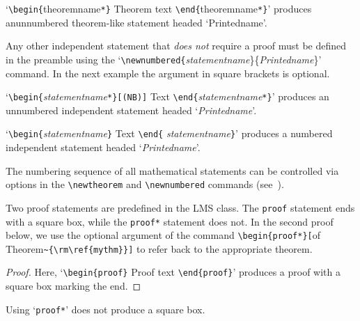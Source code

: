 \documentclass{lms}
\begin{document}
\begin{theorem*}
`\/\verb"\begin{"theoremname\verb"*}" Theorem text %
\verb"\end{"theoremname\verb"*}"\/' produces an\break unnumbered
theorem-like statement headed `Printedname'.
\end{theorem*}

Any other independent statement that \emph{does not} require a
proof must be defined in the preamble using the
`\verb"\newnumbered{"{\em statementname}\}\{{\em Printedname}\}'
command. In the next example the argument in square brackets is
optional.

\begin{remark*}[(NB)] %
`\verb"\begin{"{\em statementname}\verb"*}[(NB)]" Text
\verb"\end{"{\em statementname}\verb"*}"' produces an unnumbered
independent statement headed `{\em Printedname\/}'.
\end{remark*}

\begin{example}
`\verb"\begin{"{\em statementname}\verb"}" Text \verb"\end{"{\em
statementname}\verb"}"' produces a numbered independent statement
headed `{\em Printedname\/}'.
\end{example}

The numbering sequence of all mathematical statements can be
controlled via options in the \verb"\newtheorem" and
\verb"\newnumbered" commands (see~\cite[p.\,193]{Lamport}).

Two proof statements are predefined in the LMS class. The
\verb"proof" statement ends with a square box, while the
\verb"proof*" statement does not. In the second proof below, we
use the optional argument of the command \verb"\begin{proof*}["of
Theorem\verb"~{\rm\ref{mythm}}]" to refer back to the appropriate
theorem.

\begin{proof}
Here, `\/\verb"\begin{proof}" Proof text \verb"\end{proof}"\/'
produces a proof with a square box marking the end.
\end{proof}

\begin{proof*}
  Using `\verb"proof*"' does not produce a square box.
\end{proof*}
\end{document}
